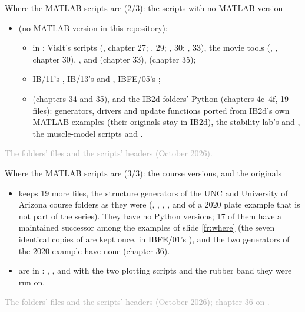 \documentclass[aspectratio=169,11pt]{beamer}
\newcommand{\sourcecredit}[1]{\vfill\begin{flushright}\tiny\textcolor{DarkGray}{#1}\end{flushright}}
\begin{document}
\begin{frame}{Where the MATLAB scripts are (2/3): the scripts with no MATLAB version}
\label{fr:where2}
\footnotesize
\begin{itemize}\setlength{\itemsep}{2pt}
  \item {} (no MATLAB version in this repository):
  \begin{itemize}\setlength{\itemsep}{1pt}
    \item in : VisIt's scripts (, chapter 27; , 29; , 30; , 33), the movie tools (, , chapter 30), ,  and  (chapter 33),  (chapter 35);
    \item IB/11's , IB/13's  and , IBFE/05's ;
    \item {} (chapters 34 and 35), and the IB2d folders' Python (chapters 4c--4f, 19 files): generators, drivers and update functions ported from IB2d's own MATLAB examples (their originals stay in IB2d), the stability lab's  and , the muscle-model scripts and .
  \end{itemize}
\end{itemize}
\sourcecredit{The folders'  files and the scripts' headers (October 2026).}
\end{frame}

\begin{frame}{Where the MATLAB scripts are (3/3): the course versions, and the originals}
\label{fr:where3}
\footnotesize
\begin{itemize}\setlength{\itemsep}{3pt}
  \item {}  keeps 19 more  files, the structure generators of the UNC and University of Arizona course folders as they were (, , , , and  of a 2020 plate example that is not part of the series). They have no Python versions; 17 of them have a maintained successor among the examples of slide \ref{fr:where} (the seven identical copies of  are kept once, in IBFE/01's ), and the two generators of the 2020 example have none (chapter 36).
  \item {} are in : , , and  with the two plotting scripts and the rubber band they were run on.
\end{itemize}
\sourcecredit{The folders'  files and the scripts' headers (October 2026); chapter 36 on \code{legacy/}.}
\end{frame}
\end{document}
